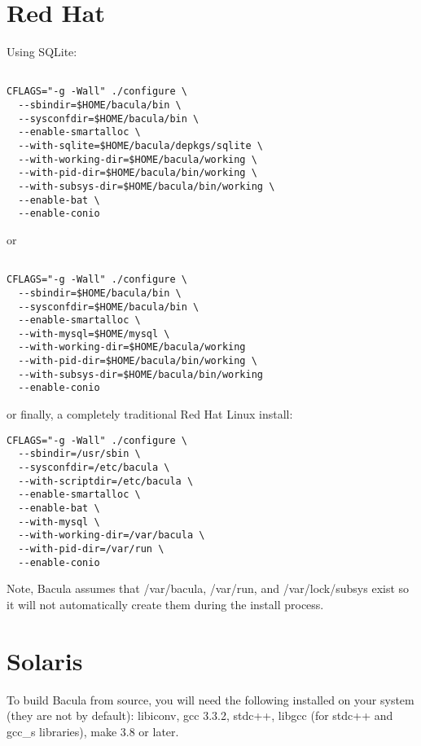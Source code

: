 \section{Red Hat}

Using SQLite: 

\footnotesize
\begin{verbatim}
 
CFLAGS="-g -Wall" ./configure \
  --sbindir=$HOME/bacula/bin \
  --sysconfdir=$HOME/bacula/bin \
  --enable-smartalloc \
  --with-sqlite=$HOME/bacula/depkgs/sqlite \
  --with-working-dir=$HOME/bacula/working \
  --with-pid-dir=$HOME/bacula/bin/working \
  --with-subsys-dir=$HOME/bacula/bin/working \
  --enable-bat \
  --enable-conio
\end{verbatim}
\normalsize

or 

\footnotesize
\begin{verbatim}
 
CFLAGS="-g -Wall" ./configure \
  --sbindir=$HOME/bacula/bin \
  --sysconfdir=$HOME/bacula/bin \
  --enable-smartalloc \
  --with-mysql=$HOME/mysql \
  --with-working-dir=$HOME/bacula/working
  --with-pid-dir=$HOME/bacula/bin/working \
  --with-subsys-dir=$HOME/bacula/bin/working
  --enable-conio
\end{verbatim}
\normalsize

or finally, a completely traditional Red Hat Linux install: 

\footnotesize
\begin{verbatim}
CFLAGS="-g -Wall" ./configure \
  --sbindir=/usr/sbin \
  --sysconfdir=/etc/bacula \
  --with-scriptdir=/etc/bacula \
  --enable-smartalloc \
  --enable-bat \
  --with-mysql \
  --with-working-dir=/var/bacula \
  --with-pid-dir=/var/run \
  --enable-conio
\end{verbatim}
\normalsize

Note, Bacula assumes that /var/bacula, /var/run, and /var/lock/subsys exist so
it will not automatically create them during the install process. 

\section{Solaris}

To build Bacula from source, you will need the following installed on your
system (they are not by default): libiconv, gcc 3.3.2, stdc++, libgcc (for
stdc++ and gcc\_s libraries), make 3.8 or later. 

